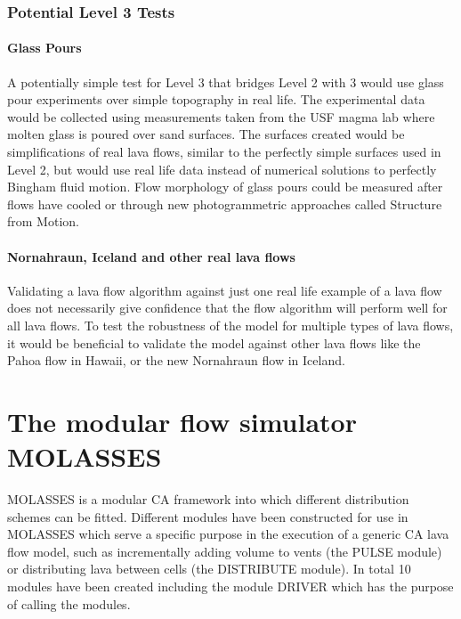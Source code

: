 \documentclass[12pt,letter]{article}
\begin{document}
		\subsubsection{Potential Level 3 Tests}
		\paragraph{Glass Pours}
			A potentially simple test for Level 3 that bridges Level 2 with 3 would use glass pour experiments over simple topography in real life. The experimental data would be collected using measurements taken from the USF magma lab where molten glass is poured over sand surfaces. The surfaces created would be simplifications of real lava flows, similar to the perfectly simple surfaces used in Level 2, but would use real life data instead of numerical solutions to perfectly Bingham fluid motion. Flow morphology of glass pours could be measured after flows have cooled or through new photogrammetric approaches called Structure from Motion.
			
		\paragraph{Nornahraun, Iceland and other real lava flows}
			Validating a lava flow algorithm against just one real life example of a lava flow does not necessarily give confidence that the flow algorithm will perform well for all lava flows. To test the robustness of the model for multiple types of lava flows, it would be beneficial to validate the model against other lava flows like the Pahoa flow in Hawaii, or the new Nornahraun flow in Iceland.
			
		




\section{The modular flow simulator MOLASSES}\label{sec:MOLASSES}

	MOLASSES is a modular CA framework into which different distribution schemes can be fitted. Different modules have been constructed for use in MOLASSES which serve a specific purpose in the execution of a generic CA lava flow model, such as incrementally adding volume to vents (the PULSE module) or distributing lava between cells (the DISTRIBUTE module). In total 10 modules have been created including the module DRIVER which has the purpose of calling the modules.
	
\end{document}
